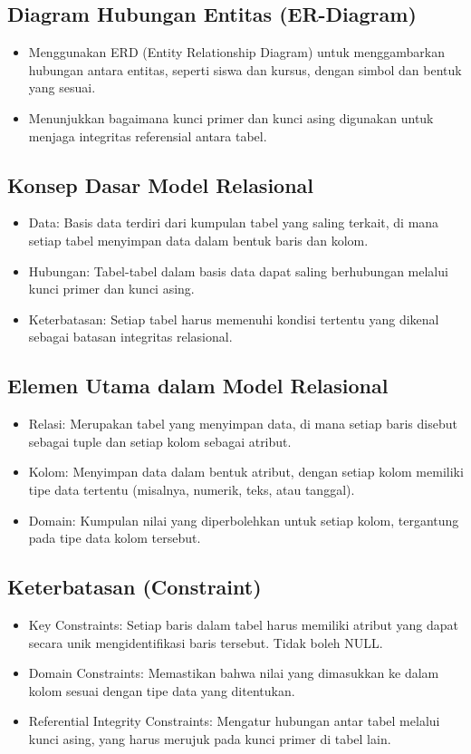 \documentclass{article}
\begin{document}
\subsection{Diagram Hubungan Entitas (ER-Diagram)}
\begin{itemize}
    \item Menggunakan ERD (Entity Relationship Diagram) untuk menggambarkan hubungan antara entitas, seperti siswa dan kursus, dengan simbol dan bentuk yang sesuai.
    \item Menunjukkan bagaimana kunci primer dan kunci asing digunakan untuk menjaga integritas referensial antara tabel.
\end{itemize}

\subsection{Konsep Dasar Model Relasional}
\begin{itemize}
    \item Data: Basis data terdiri dari kumpulan tabel yang saling terkait, di mana setiap tabel menyimpan data dalam bentuk baris dan kolom.
    \item Hubungan: Tabel-tabel dalam basis data dapat saling berhubungan melalui kunci primer dan kunci asing.
    \item Keterbatasan: Setiap tabel harus memenuhi kondisi tertentu yang dikenal sebagai batasan integritas relasional.
\end{itemize}

\subsection{Elemen Utama dalam Model Relasional}
\begin{itemize}
    \item Relasi: Merupakan tabel yang menyimpan data, di mana setiap baris disebut sebagai tuple dan setiap kolom sebagai atribut.
    \item Kolom: Menyimpan data dalam bentuk atribut, dengan setiap kolom memiliki tipe data tertentu (misalnya, numerik, teks, atau tanggal).
    \item Domain: Kumpulan nilai yang diperbolehkan untuk setiap kolom, tergantung pada tipe data kolom tersebut.
\end{itemize}

\subsection{Keterbatasan (Constraint)}
\begin{itemize}
    \item Key Constraints: Setiap baris dalam tabel harus memiliki atribut yang dapat secara unik mengidentifikasi baris tersebut. Tidak boleh NULL.\@
    \item Domain Constraints: Memastikan bahwa nilai yang dimasukkan ke dalam kolom sesuai dengan tipe data yang ditentukan.
    \item Referential Integrity Constraints: Mengatur hubungan antar tabel melalui kunci asing, yang harus merujuk pada kunci primer di tabel lain.
\end{itemize}
\end{document}
